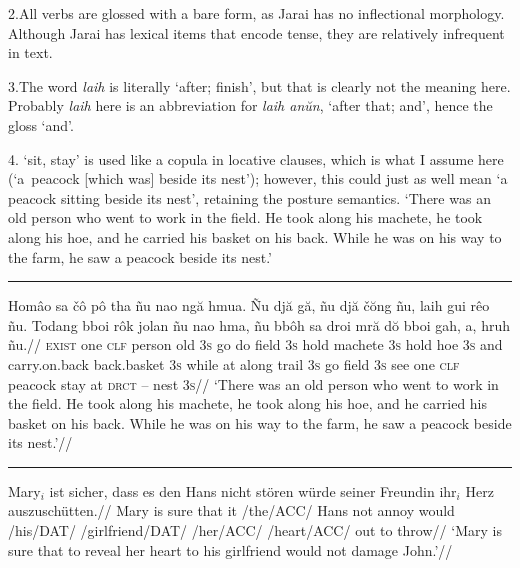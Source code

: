 2.\enspace All verbs are glossed with a bare form, as Jarai has
no inflectional morphology. Although Jarai has lexical items that
encode tense, they are relatively infrequent in text.

3.\enspace The word {\it laih} is literally `after; finish', but
that is clearly not the meaning here. Probably {\it laih} here is
an abbreviation for {\it laih an\u{u}n}, `after that; and', hence
the gloss `and'.

4. `sit, stay' is used like a copula in
locative clauses, which is what I assume here (`a~peacock
[which was] beside its nest'); however, this could just as well
mean `a peacock sitting beside its nest', retaining the posture
semantics.
\endpanel
\bigskip
`There was an old person who went to work in the field. He took
along his machete, he took along his hoe, and he carried his
basket on his back. While he was on his way to the farm, he saw a
peacock beside its nest.'
\xe
\endgroup
\bigskip

\filbreak\hrule\medskip

\begingroup
\ex[glhangstyle=cascade]
\let\\=\textsc
\begingl
\gla
Hom\^{a}o sa \v{c}\^{o} p\^{o} tha  \~{n}u nao ng\u{a} hmua. \~{N}u
dj\u{a} g\u{a}, \~{n}u dj\u{a} \v{c}\u{o}ng \~{n}u, laih gui r\^{e}o
\~{n}u. Todang bboi r\^{o}k jolan \~{n}u nao hma, \~{n}u bb\^{o}h sa
droi mr\u{a} d\u{o} bboi gah, a, hruh \~{n}u.//
\glb
\\{exist} one \\{clf} person old \\{3s} go do field \\{3s} hold
machete \\{3s} hold hoe \\{3s} and carry.on.back back.basket \\{3s}
while at along trail \\{3s} go field \\{3s} see one \\{clf} peacock
stay at \\{drct} -- nest \\{3s}//
\glft
`There was an old person who went to work in the field. He took
along his machete, he took along his hoe, and he carried his
basket on his back. While he was on his way to the farm, he saw a
peacock beside its nest.'//
\endgl
\xe
\endgroup
\bigskip

\filbreak\hrule\medskip

\begingroup
\ex[glufcloseup=.4ex,everygluf=\footnotesize]
\begingl
\gla Mary$_i$ ist sicher, dass es den Hans nicht st\"oren
   w\"urde seiner Freundin ihr$_i$ Herz auszusch\"utten.//
\glb Mary is sure that it \gluf/the/ACC/ Hans not annoy would
   \gluf/his/DAT/ \gluf/girlfriend/DAT/ \gluf/her/ACC/
   \gluf/heart/ACC/ {out to throw}//
\glft `Mary is sure that to reveal her heart to his girlfriend
would not damage John.'//
\endgl
\xe
\endgroup
\bigskip

